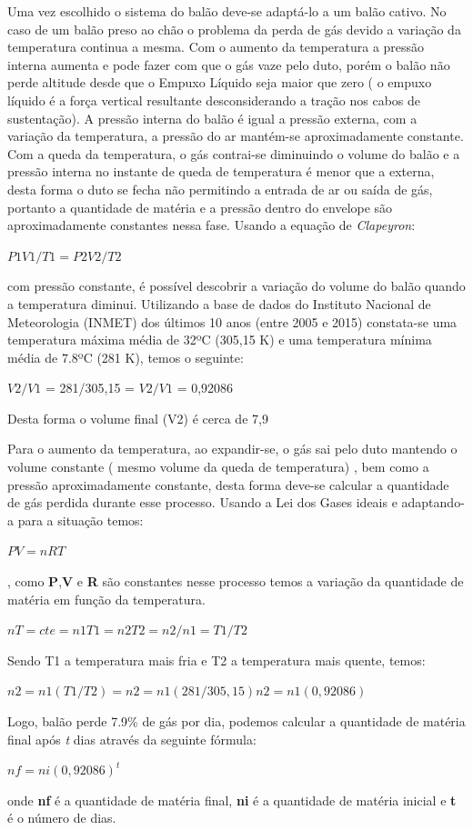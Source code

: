 		Uma vez escolhido o sistema do balão deve-se adaptá-lo a um balão cativo. No caso de um balão preso ao chão o problema da perda de gás devido a variação da temperatura continua a mesma. Com o aumento da temperatura a pressão interna aumenta e pode fazer com que o gás vaze pelo duto, porém o balão não perde altitude desde que o Empuxo Líquido seja maior que zero ( o empuxo líquido é a força vertical resultante desconsiderando a tração nos cabos de sustentação). A pressão interna do balão é igual a pressão externa, com a variação da temperatura, a pressão do ar mantém-se aproximadamente constante.  Com a queda da temperatura, o gás contrai-se diminuindo o volume do balão e a pressão interna no instante de queda de temperatura é menor que a externa, desta forma o duto se fecha não permitindo a entrada de ar ou saída de gás, portanto a quantidade de matéria e a pressão dentro do envelope são aproximadamente constantes nessa fase. Usando a equação de \textit{Clapeyron}:

			$P1V1/T1 = P2V2/T2$

		com pressão constante, é possível descobrir a variação do volume do balão quando a temperatura diminui. Utilizando a base de dados do Instituto Nacional de Meteorologia (INMET) dos últimos 10 anos (entre 2005 e 2015) constata-se uma temperatura máxima média de 32ºC (305,15 K) e uma temperatura mínima média de 7.8ºC (281 K), temos o seguinte:

			 $V2/V1$ = 281/305,15  = $V2/V1$ = 0,92086

		Desta forma o volume final (V2) é cerca de 7,9%
		
		Para o aumento da temperatura, ao expandir-se, o gás sai pelo duto mantendo o volume constante ( mesmo volume da queda de temperatura) , bem como a pressão aproximadamente constante, desta forma deve-se calcular a quantidade de gás perdida durante esse processo. Usando a Lei dos Gases ideais e adaptando-a para a situação temos:

			$PV = nRT$

		, como \textbf{P},\textbf{V} e \textbf{R} são constantes nesse processo temos a variação da quantidade de matéria em função da temperatura.

		$nT = cte  = n1T1 = n2T2  = n2/n1 = T1/T2$

		Sendo T1 a temperatura mais fria e T2 a temperatura mais quente, temos:

			$n2 = n1(T1/T2) = n2 = n1 (281/305,15) n2 = n1 (0,92086)$

		Logo, balão perde 7.9\% de gás por dia, podemos calcular a quantidade de matéria final após \textit{t} dias através da seguinte fórmula:

			$nf = ni (0,92086)^t$
			                                 
 		onde \textbf{nf} é a quantidade de matéria final, \textbf{ni} é a quantidade de matéria inicial e \textbf{t} é o número de dias.


